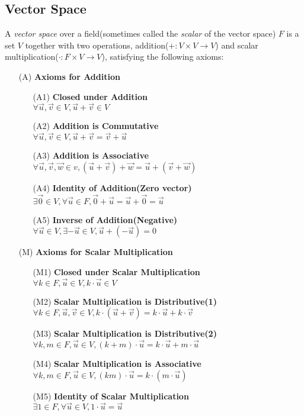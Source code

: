 \documentclass{report}
\begin{document}
		\subsection{Vector Space}\label{chap_vector_space}
		\begin{defn}
			A \emph{vector space} over a field(sometimes called the \emph{scalar} of the vector space) $F$ is a set $V$ together with two operations, addition($+:V\times V \rightarrow V$) and scalar multiplication($\cdot:F \times V \rightarrow V$), satisfying the following axioms:
			\begin{itemize}
				\item[(A)] \textbf{Axioms for Addition}
				\begin{itemize}
					\item[(A1)] \textbf{Closed under Addition}\\$\forall \vec{u} ,\vec{v} \in V, \vec{u}+\vec{v} \in V$
					\item[(A2)] \textbf{Addition is Commutative}\\$\forall \vec{u}, \vec{v} \in V, \vec{u}+\vec{v}=\vec{v}+\vec{u}$
					\item[(A3)] \textbf{Addition is Associative}\\$\forall \vec{u},\vec{v},\vec{w} \in v, (\vec{u}+\vec{v})+\vec{w}=\vec{u}+(\vec{v}+\vec{w})$
					\item[(A4)] \textbf{Identity of Addition(Zero vector)}\\$\exists \vec{0} \in V, \forall \vec{u} \in F, \vec{0}+\vec{u}=\vec{u}+\vec{0}=\vec{u}$
					\item[(A5)] \textbf{Inverse of Addition(Negative)}\\$\forall \vec{u} \in V, \exists -\vec{u} \in V, \vec{u}+(-\vec{u})=0$
				\end{itemize}
				\item[(M)] \textbf{Axioms for Scalar Multiplication}
				\begin{itemize}
					\item[(M1)] \textbf{Closed under Scalar Multiplication}\\$\forall k \in F, \vec{u} \in V, k \cdot \vec{u} \in V$
					\item[(M2)] \textbf{Scalar Multiplication is Distributive(1)}\\$\forall k \in F, \vec{u}, \vec{v} \in V, k \cdot (\vec{u}+\vec{v})=k \cdot \vec{u} + k \cdot \vec{v}$
					\item[(M3)] \textbf{Scalar Multiplication is Distributive(2)}\\$\forall k, m \in F, \vec{u} \in V, (k+m) \cdot \vec{u}=k \cdot \vec{u} + m \cdot \vec{u}$
					\item[(M4)] \textbf{Scalar Multiplication is Associative}\\$\forall k, m \in F, \vec{u} \in V, (km) \cdot \vec{u}=k \cdot (m \cdot \vec{u})$
					\item[(M5)] \textbf{Identity of Scalar Multiplication}\\$\exists 1 \in F, \forall \vec{u} \in V, 1 \cdot \vec{u}=\vec{u}$
				\end{itemize}
			\end{itemize}
		\end{defn}
	
\end{document}
